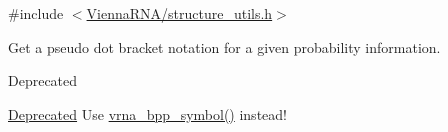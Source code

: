 {\ttfamily \#include $<$\hyperlink{structure__utils_8h}{Vienna\-R\-N\-A/structure\-\_\-utils.\-h}$>$}



Get a pseudo dot bracket notation for a given probability information. 

\begin{DoxyRefDesc}{Deprecated}
\item[\hyperlink{deprecated__deprecated000143}{Deprecated}]Use \hyperlink{group__struct__utils_ga025bff1b27fa46534c8fae6980f64bb5}{vrna\-\_\-bpp\-\_\-symbol()} instead! \end{DoxyRefDesc}
